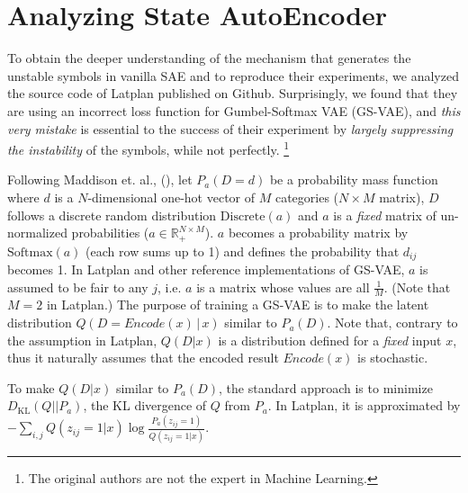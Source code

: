 \section{Analyzing State AutoEncoder}
\label{analysis}

To obtain the deeper understanding of the mechanism that generates the
unstable symbols in vanilla SAE and to reproduce their experiments, we
analyzed the source code of Latplan published on Github.
% 
Surprisingly, we found that they are using an incorrect loss function for Gumbel-Softmax VAE (GS-VAE),
and \emph{this very mistake} is essential to the success of their experiment
by \emph{largely suppressing the instability} of the symbols, while not perfectly.
\footnote{The original authors are not the expert in Machine Learning.}

 
Following Maddison et. al., (\citeyear[Appendix C.1]{MaddisonMT17}),
let $P_a(D=d)$ be a probability mass function where
$d$ is a $N$-dimensional one-hot vector of $M$ categories ($N\times M$ matrix),
$D$ follows a discrete random distribution $\text{Discrete}(a)$ and
$a$ is a \emph{fixed} matrix of un-normalized probabilities ($a\in \mathbb{R}_+^{N\times M}$).
$a$ becomes a probability matrix by $\text{Softmax}(a)$ (each row sums up to 1)
and defines the probability that $d_{ij}$ becomes 1.
% 
In Latplan and other reference implementations \cite{ericjanggithub} of GS-VAE,
$a$ is assumed to be fair to any $j$,
i.e. $a$ is a matrix whose values are all $\frac{1}{M}$. (Note that $M=2$ in Latplan.)
The purpose of training a GS-VAE is to make the latent distribution $Q(D=Encode(x)\, |\, x)$ similar to $P_a(D)$.
Note that, contrary to the assumption in Latplan,
$Q(D|x)$ is a distribution defined for a \emph{fixed} input $x$, thus it naturally assumes that
the encoded result $Encode(x)$ is stochastic.


To make $Q(D|x)$ similar to $P_a(D)$, the standard approach is to minimize $D_{\text{KL}}(Q||P_a)$,
the KL divergence of $Q$ from $P_a$.
In Latplan, it is approximated by $- \sum_{i,j} Q(z_{ij}=1|x) \log\frac{P_a(z_{ij}=1)}{Q(z_{ij}=1|x)}$.
\cite[Eq.22 --- However, it lacks negation because it is discussing a maximization objective.]{MaddisonMT17}

